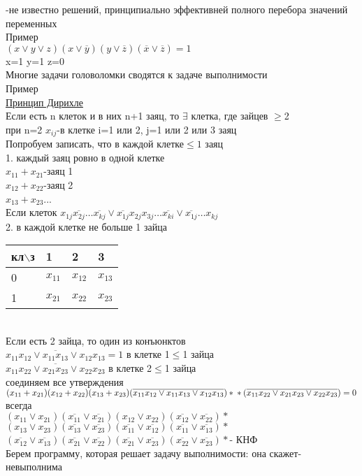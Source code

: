 \documentclass{article}
\begin{document}
-не известно решений, принципиально эффективней полного перебора значений переменных\\
Пример\\
$(x\vee y\vee z)(x\vee \overline{y})(y\vee \overline{z})(\overline{x}\vee \overline{z})=1$\\
x=1 y=1 z=0\\
Многие задачи головоломки сводятся к задаче выполнимости\\
Пример\\
\underline{Принцип Дирихле}\\
Если есть n клеток и в них n+1 заяц, то $\exists$ клетка, где зайцев $\geq$2\\
при n=2 $x_{ij}$-в клетке i=1 или 2, j=1 или 2 или 3 заяц\\
Попробуем записать, что в каждой клетке$\leq 1$ заяц\\
1. каждый заяц ровно в одной клетке\\
$x_{11}+x_{21}$-заяц 1\\
$x_{12}+x_{22}$-заяц 2\\
$x_{13}+x_{23}$...\\
Если клеток $x_{1j}\overline{x_{2j}}\dots \overline{x_{kj}}\vee\overline{x_{1j}}x_{2j}x_{3j}\dots\overline{x_{ki}}\vee \overline{x_{1j}}\dots x_{kj}$\\
2. в каждой клетке не больше 1 зайца\\
\begin{tabular}{l|lll}
 кл$\backslash$з&1&2&3\\
\hline
0  &  $x_{11}$ &$x_{12}$&$x_{13}$ \\
1  &  $x_{21}$ &$x_{22}$&$x_{23}$ \\
\end{tabular}\\
Если есть 2 зайца, то один из конъюнктов\\
$\overline{x_{11}x_{12}\vee x_{11}x_{13}\vee x_{12}x_{13}}=1$ в клетке 1$\leq$1 зайца\\
$\overline{x_{11}x_{22}\vee x_{21}x_{23}\vee x_{22}x_{23}}$ в клетке 2$\leq$1 зайца\\
соединяем все утверждения\\
$(x_{11}+x_{21})(x_{12}+x_{22})(x_{13}+x_{23})(\overline{x_{11}x_{12}\vee x_{11}x_{13}\vee x_{12}x_{13}})*\\
*(\overline{x_{11}x_{22}\vee x_{21}x_{23}\vee x_{22}x_{23}})=0$ всегда\\
$(x_{11}\vee x_{21})(\overline{x_{11}}\vee\overline{x_{21}})(x_{12}\vee x_{22})(\overline{x_{12}}\vee\overline{x_{22}})*$\\
$(x_{13}\vee x_{23})(\overline{x_{13}}\vee \overline{x_{23}})(\overline{x_{11}}\vee\overline{x_{12}})(\overline{x_{11}}\vee \overline{x_{13}})*$\\
$(\overline{x_{12}}\vee \overline{x_{13}})(\overline{x_{21}}\vee \overline{x_{22}})(\overline{x_{21}}\vee\overline{x_{23}})(\overline{x_{22}}\vee \overline{x_{23}})*$- КНФ\\
Берем программу, которая решает задачу выполнимости: она скажет- невыполнима
\end{document}
